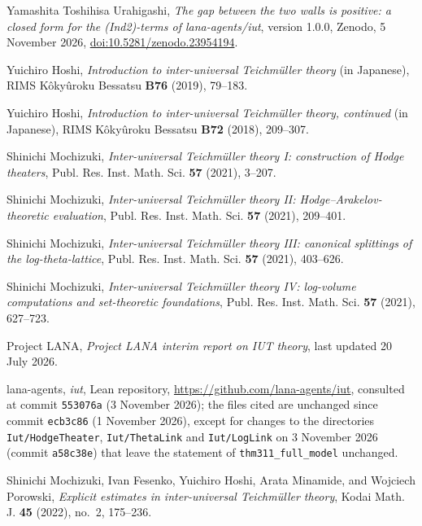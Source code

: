 \documentclass[11pt,a4paper]{article}
\begin{document}
\begin{thebibliography}{Yamashita}
Toshihisa Urahigashi, \emph{The gap between the two walls is positive: a closed form for the (Ind2)-terms of
lana-agents/iut}, version 1.0.0, Zenodo, 5 November 2026,
\href{https://doi.org/10.5281/zenodo.23954194}{doi:10.5281/zenodo.23954194}.

Yuichiro Hoshi, \emph{Introduction to inter-universal {T}eichm\"uller theory} (in Japanese), RIMS
K\^oky\^uroku Bessatsu \textbf{B76} (2019), 79--183.

Yuichiro Hoshi, \emph{Introduction to inter-universal {T}eichm\"uller theory, continued} (in Japanese), RIMS
K\^oky\^uroku Bessatsu \textbf{B72} (2018), 209--307.

Shinichi Mochizuki, \emph{Inter-universal {T}eichm\"uller theory {I}: construction of {H}odge theaters},
Publ. Res. Inst. Math. Sci. \textbf{57} (2021), 3--207.

Shinichi Mochizuki, \emph{Inter-universal {T}eichm\"uller theory {II}: {H}odge--{A}rakelov-theoretic
evaluation}, Publ. Res. Inst. Math. Sci. \textbf{57} (2021), 209--401.

Shinichi Mochizuki, \emph{Inter-universal {T}eichm\"uller theory {III}: canonical splittings of the
log-theta-lattice}, Publ. Res. Inst. Math. Sci. \textbf{57} (2021), 403--626.

Shinichi Mochizuki, \emph{Inter-universal {T}eichm\"uller theory {IV}: log-volume computations and
set-theoretic foundations}, Publ. Res. Inst. Math. Sci. \textbf{57} (2021), 627--723.

Project LANA, \emph{Project LANA interim report on IUT theory}, last updated 20 July 2026.

lana-agents, \emph{iut}, Lean repository, \url{https://github.com/lana-agents/iut}, consulted at commit
\texttt{553076a} (3 November 2026); the files cited are unchanged since commit \texttt{ecb3c86} (1 November 2026),
except for changes to the directories \nolinkurl{Iut/HodgeTheater}, \nolinkurl{Iut/ThetaLink} and \nolinkurl{Iut/LogLink}
on 3 November 2026 (commit \texttt{a58c38e}) that leave the statement of \nolinkurl{thm311_full_model} unchanged.

Shinichi Mochizuki, Ivan Fesenko, Yuichiro Hoshi, Arata Minamide, and Wojciech Porowski, \emph{Explicit
estimates in inter-universal {T}eichm\"uller theory}, Kodai Math. J. \textbf{45} (2022), no.~2, 175--236.


\end{thebibliography}
\end{document}
